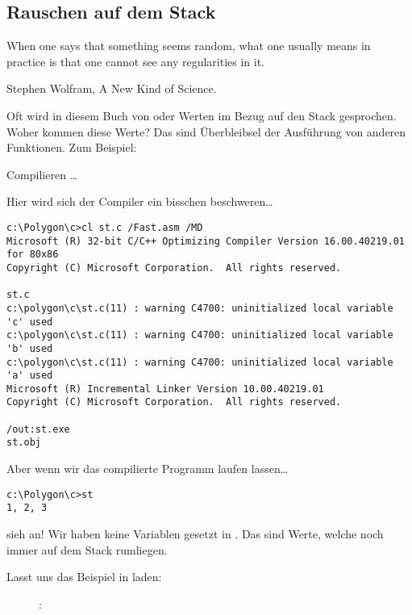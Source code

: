 \subsection{Rauschen auf dem Stack}

\epigraph{When one says that something seems random, what one usually
means in practice is that one cannot see any regularities in it.}{Stephen Wolfram, A New Kind of Science.}

Oft wird in diesem Buch von  oder  Werten im Bezug
auf den Stack gesprochen. Woher kommen diese Werte? Das sind Überbleibsel der
Ausführung von anderen Funktionen. Zum Beispiel: 



Compilieren \dots



Hier wird sich der Compiler ein bisschen beschweren\dots

\begin{lstlisting}
c:\Polygon\c>cl st.c /Fast.asm /MD
Microsoft (R) 32-bit C/C++ Optimizing Compiler Version 16.00.40219.01 for 80x86
Copyright (C) Microsoft Corporation.  All rights reserved.

st.c
c:\polygon\c\st.c(11) : warning C4700: uninitialized local variable 'c' used
c:\polygon\c\st.c(11) : warning C4700: uninitialized local variable 'b' used
c:\polygon\c\st.c(11) : warning C4700: uninitialized local variable 'a' used
Microsoft (R) Incremental Linker Version 10.00.40219.01
Copyright (C) Microsoft Corporation.  All rights reserved.

/out:st.exe
st.obj
\end{lstlisting}

Aber wenn wir das compilierte Programm laufen lassen\dots

\begin{lstlisting}
c:\Polygon\c>st
1, 2, 3
\end{lstlisting}

sieh an! Wir haben keine Variablen gesetzt in .
Das sind  Werte, welche noch immer auf dem Stack rumliegen.

\clearpage
Lasst uns das Beispiel in \olly laden:

\begin{figure}[H]
\centering
{}
\caption{\olly: }
\label{fig:stack_noise_olly1}
\end{figure}

